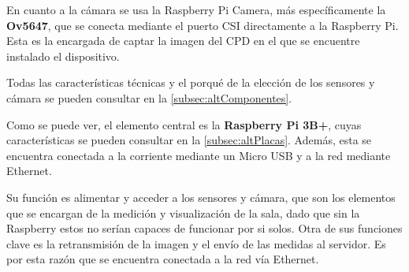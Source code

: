 En cuanto a la cámara se usa la Raspberry Pi Camera, más específicamente la \textbf{Ov5647}, que se conecta mediante el puerto CSI directamente a la Raspberry Pi. Esta es la encargada de captar la imagen del CPD en el que se encuentre instalado el dispositivo.

Todas las características técnicas y el porqué de la elección de los sensores y cámara se pueden consultar en la \autoref{subsec:altComponentes}.

Como se puede ver, el elemento central es la \textbf{Raspberry Pi 3B+}, cuyas características se pueden consultar en la \autoref{subsec:altPlacas}. Además, esta se encuentra conectada a la corriente mediante un Micro USB y a la red mediante Ethernet.

Su función es alimentar y acceder a los sensores y cámara, que son los elementos que se encargan de la medición y visualización de la sala, dado que sin la Raspberry estos no serían capaces de funcionar por si solos. Otra de sus funciones clave es la retransmisión de la imagen y el envío de las medidas al servidor. Es por esta razón que se encuentra conectada a la red vía Ethernet.